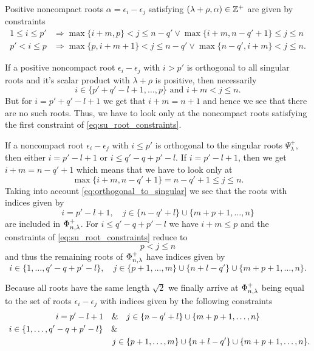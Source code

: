 Positive noncompact roots $\alpha = \epsilon_i - \epsilon_j$ satisfying $(\lambda + \rho, \alpha)\in \mathbb{Z}^+$ are given by constraints
\begin{equation}\label{eq:su_root_constraints}
\begin{split}
 1 \leq i \leq p' & \Longrightarrow \max \{ i+m, p \} < j \leq n-q' \vee \max \{ i+m, n-q'+1 \}  \leq j \leq n  \\
 p' < i \leq p & \Longrightarrow \max \{p, i+m+1 \} < j \leq n-q' \vee \max \{n-q',i+m\} < j  \leq n.
 \end{split}
\end{equation}

If a positive noncompact root $\epsilon_i - \epsilon_j$ with $i>p'$ is orthogonal to all singular roots and it's scalar product with $\lambda + \rho$ is positive, then necessarily
\[
 i\in \{ p'+q'-l+1,\ldots, p \} \text{ and } i+m < j\leq n.
\]
But for $i=p'+q'-l+1$ we get that $i+m = n+1$ and hence we see that there are no such roots. Thus, we have to look only at the noncompact roots satisfying the first constraint of \eqref{eq:su_root_constraints}.

If a noncompact root $\epsilon_i - \epsilon_j$ with $i\leq p'$ is orthogonal to the singular roots $\Psi_\lambda^+$, then either $i=p'-l+1$ or $i \leq q'-q + p'-l$. If $i=p'-l+1$, then we get $i+m = n-q'+1$ which means that we have to look only at
\[
 \max \{ i+m, n-q'+1 \} = n-q'+1  \leq j \leq n.
\]
Taking into account \eqref{eq:orthogonal_to_singular} we see that the roots with indices given by
\[
 i = p'-l+1, \quad j \in \{n-q'+l\} \cup \{m+p+1, \ldots,n\}
\]
are included in $\Phi_{n,\lambda}^+$. For  $i\leq q'-q + p'-l$ we have $i+m \leq p$ and the constraints of \eqref{eq:su_root_constraints} reduce to
\[
 p < j \leq n
\]
and thus the remaining roots of $\Phi_{n,\lambda}^+$ have indices given by
\[
  i \in \{ 1,\ldots, q'-q+p'-l\}, \quad
  j \in \{p+1,\ldots,  m\} \cup \{n+l-q'\} \cup \{m+p+1, \ldots,n\}.
\]

Because all roots have the same length $\sqrt{2}$ we finally arrive at $\Phi_{n,\lambda}^+ $ being equal to the set of roots $\epsilon_i - \epsilon_j$ with indices given by the following constraints
\begin{gather}
  i = p'-l+1 \quad \&\quad  j \in \{n-q'+l\} \cup \{m+p+1, \ldots,n\} \\ \notag
  i \in \{ 1,\ldots, q'-q+p'-l\} \quad \& \hspace{8cm} \\ \notag \hspace{4.5cm}  j \in \{p+1,\ldots,  m\} \cup \{n+l-q'\} \cup \{m+p+1, \ldots,n\}.\notag
\end{gather}

